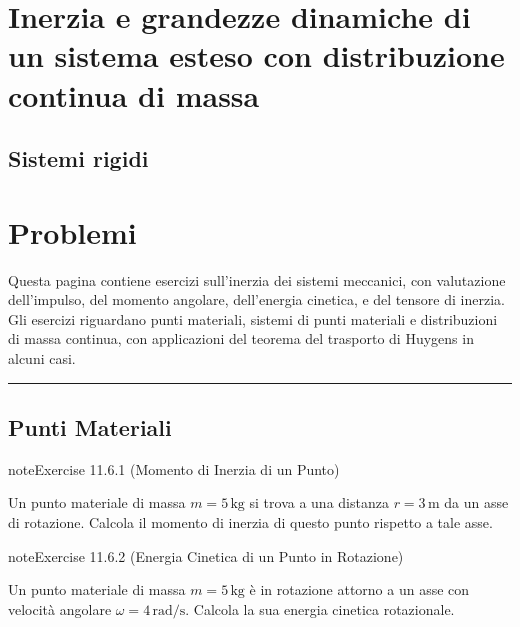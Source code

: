 \documentclass[letterpaper,10pt,italian]{jupyterBook}
\begin{document}
\section{Inerzia e grandezze dinamiche di un sistema esteso con distribuzione continua di massa}
\label{\detokenize{ch/mechanics/inertia-continuum:inerzia-e-grandezze-dinamiche-di-un-sistema-esteso-con-distribuzione-continua-di-massa}}\label{\detokenize{ch/mechanics/inertia-continuum::doc}}

\subsection{Sistemi rigidi}
\label{\detokenize{ch/mechanics/inertia-continuum:sistemi-rigidi}}
\sphinxstepscope


\section{Problemi}
\label{\detokenize{ch/mechanics/inertia-problems:problemi}}\label{\detokenize{ch/mechanics/inertia-problems::doc}}
\sphinxAtStartPar
Questa pagina contiene esercizi sull’inerzia dei sistemi meccanici, con valutazione dell’impulso, del momento angolare, dell’energia cinetica, e del tensore di inerzia. Gli esercizi riguardano punti materiali, sistemi di punti materiali e distribuzioni di massa continua, con applicazioni del teorema del trasporto di Huygens in alcuni casi.


\bigskip\hrule\bigskip



\subsection{Punti Materiali}
\label{\detokenize{ch/mechanics/inertia-problems:punti-materiali}} \label{exercise:ch/mechanics/inertia-problems-exercise-0}

\begin{sphinxadmonition}{note}{Exercise 11.6.1 (Momento di Inerzia di un Punto)}



\sphinxAtStartPar
Un punto materiale di massa \(m = 5 \, \text{kg}\) si trova a una distanza \(r = 3 \, \text{m}\) da un asse di rotazione. Calcola il momento di inerzia di questo punto rispetto a tale asse.
\end{sphinxadmonition}
 \label{exercise:ch/mechanics/inertia-problems-exercise-1}

\begin{sphinxadmonition}{note}{Exercise 11.6.2 (Energia Cinetica di un Punto in Rotazione)}



\sphinxAtStartPar
Un punto materiale di massa \(m = 5 \, \text{kg}\) è in rotazione attorno a un asse con velocità angolare \(\omega = 4 \, \text{rad/s}\). Calcola la sua energia cinetica rotazionale.
\end{sphinxadmonition}
 \label{exercise:ch/mechanics/inertia-problems-exercise-2}
\end{document}
